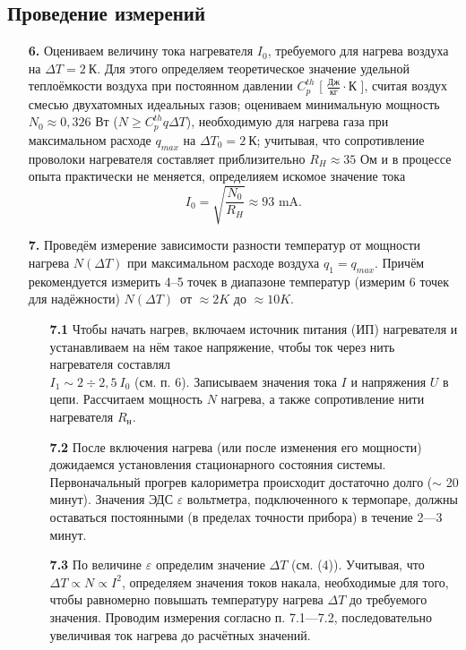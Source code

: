 \documentclass[a4paper,12pt]{article}
\begin{document}
	\subsection*{Проведение измерений}
	\begin{enumerate}
        \item [\textbf{6.}] Оцениваем величину тока нагревателя $I_0$, требуемого для нагрева воздуха на $\Delta T = 2\ К$. Для этого определяем теоретическое значение удельной теплоёмкости воздуха при постоянном давлении $C_p^{th}$ [ $ \frac{Дж}{кг}\cdot$К ], считая воздух смесью двухатомных идеальных газов; оцениваем минимальную мощность\\ $N_0 \approx 0,326$ Вт ($N \geq C_p^{th} q \Delta T$), необходимую для нагрева газа при максимальном расходе $q_{max}$ на $\Delta T_0 = 2\ К$; учитывая, что сопротивление проволоки нагревателя составляет приблизительно $R_H \approx 35$ Ом и в процессе опыта практически не меняется, определияем искомое значение тока $$I_0 = \sqrt{\dfrac{N_0}{R_H}} \approx 93 \text{ mA}. $$
        
    \item [\textbf{7.}]Проведём измерение зависимости разности температур от мощности нагрева $N(\Delta T)$ при максимальном расходе воздуха $q_1 = q_{max}$. Причём рекомендуется измерить 4--5 точек в диапазоне температур (измерим 6 точек для надёжности) $N(\Delta T)$\ от $\approx 2K$ до $\approx 10K$.
    \begin{enumerate}
    \item [\textbf{7.1}] Чтобы начать нагрев, включаем источник питания (ИП) нагревателя и устанавливаем на нём такое напряжение, чтобы ток через нить нагревателя составлял\\ $I_1 \sim 2\div2,5\ I_0$ (см. п. 6). Записываем значения тока $I$ и напряжения $U$ в цепи. Рассчитаем мощность $N$ нагрева, а также сопротивление нити нагревателя $R_{\text{н}}$.
    \item [\textbf{7.2}] После включения нагрева (или после изменения его мощности) дожидаемся установления стационарного состояния системы. Первоначальный прогрев калориметра происходит достаточно долго ($\sim$ 20 минут). Значения ЭДС $\varepsilon$ вольтметра, подключенного к термопаре, должны оставаться постоянными (в пределах точности прибора) в течение 2---3 минут.
    \item [\textbf{7.3}] По величине $\varepsilon$ определим значение $\Delta T$ (см. (4)). Учитывая, что $\Delta T \varpropto N \varpropto I^2$, определяем значения токов накала, необходимые для того, чтобы равномерно повышать температуру нагрева $\Delta T$ до требуемого значения. Проводим измерения согласно п. 7.1---7.2, последовательно увеличивая ток нагрева до расчётных значений.
    \end{enumerate}
		\begin{center}
	

\end{center}
\end{enumerate}
\end{document}
